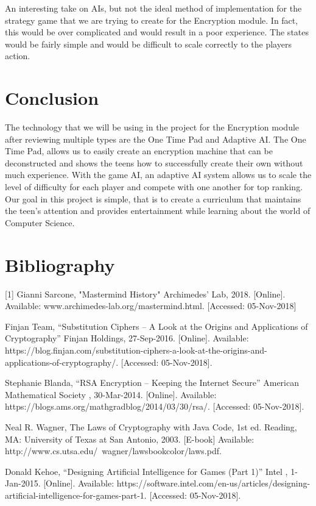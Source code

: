 \documentclass[onecolumn, draftclsnofoot,10pt, compsoc]{IEEEtran}
\begin{document}
An interesting take on AIs, but not the ideal method of implementation for the strategy game that we are trying to create for the Encryption module. In fact, this would be over complicated and would result in a poor experience. The states would be fairly simple and would be difficult to scale correctly to the players action. 

\section{Conclusion}
The technology that we will be using in the project for the Encryption module after reviewing multiple types are the One Time Pad and Adaptive AI. The One Time Pad, allows us to easily create an encryption machine that can be deconstructed and shows the teens how to successfully create their own without much experience. With the game AI, an adaptive AI system allows us to scale the level of difficulty for each player and compete with one another for top ranking. Our goal in this project is simple, that is to create a curriculum that maintains the teen's attention and provides entertainment while learning about the world of Computer Science.

\clearpage
\section{Bibliography}
[1]
Gianni Sarcone, "Mastermind History" Archimedes' Lab, 2018. [Online]. Available: \newline
www.archimedes-lab.org/mastermind.html. [Accessed: 05-Nov-2018]\newline

\noindent
[2]
Finjan Team, “Substitution Ciphers – A Look at the Origins and Applications of Cryptography” Finjan Holdings, 27-Sep-2016. [Online]. Available:  \newline https://blog.finjan.com/substitution-ciphers-a-look-at-the-origins-and-applications-of-cryptography/. [Accessed: 05-Nov-2018]. \newline

\noindent
[3]
Stephanie Blanda, “RSA Encryption – Keeping the Internet Secure” American Mathematical Society , 30-Mar-2014. [Online]. Available:  \newline https://blogs.ams.org/mathgradblog/2014/03/30/rsa/. [Accessed: 05-Nov-2018]. \newline

\noindent
[4]
Neal R. Wagner, The Laws of Cryptography with Java Code, 1st ed. Reading, MA: University of Texas at San Antonio, 2003. [E-book] Available: \newline http://www.cs.utsa.edu/~wagner/lawsbookcolor/laws.pdf. \newline

\noindent
[5]
Donald Kehoe, “Designing Artificial Intelligence for Games (Part 1)” Intel , 1-Jan-2015. [Online]. Available:  \newline https://software.intel.com/en-us/articles/designing-artificial-intelligence-for-games-part-1. [Accessed: 05-Nov-2018]. \newline
\end{document}

